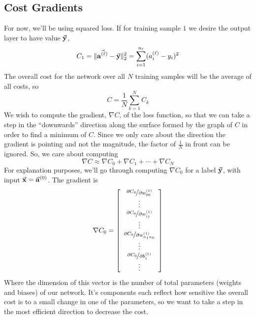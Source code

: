 \subsection{Cost Gradients}

For now, we'll be using squared loss. If for training sample $1$ we desire the output layer to have value $\vec{\mathbf{y}}$, 
\[
    C_1 = \| \vec{\mathbf{a^{(\ell)}}} - \vec{\mathbf{y}} \|_2^2 = \sum_{i = 1}^{n_\ell} (a_i^{(\ell)} - y_i)^2
\]
The overall cost for the network over all $N$ training samples will be the average of all costs, so 
\[
    C = \frac{1}{N}\sum_{k = 1}^{N} C_k
\]
We wish to compute the gradient, $\nabla C$, of the loss function, so that we can take a step in the ``downwards'' direction
along the surface formed by the graph of $C$ in order to find a minimum of $C$. Since we only care about the direction 
the gradient is pointing and not the magnitude, the factor of $\frac{1}{N}$ in front can be ignored.\ftntmk{} So, we care about 
computing 
\[
    \nabla C \approx \nabla C_0 + \nabla C_1 + \cdots + \nabla C_N
\]
For explanation purposes, we'll go through computing $\nabla C_0$ for a label $\vec{\mathbf{y}}$, with input $\vec{\mathbf{x}} = \vec{\mathbf{a}}^{(0)}$.
The gradient is 
\[
    \nabla C_0 = \left[
        \begin{array}{c}
            \nicefrac{\partial C_0}{\partial w_{00}^{(1)}} \\
            \vdots  \\
            \nicefrac{\partial C_0}{\partial w_{ij}^{(1)}} \\
            \vdots \\
            \nicefrac{\partial C_0}{\partial w_{n_1 n_0}^{(1)}} \\
            \vdots \\
            \nicefrac{\partial C_0}{\partial b_{i}^{(1)}} \\
            \vdots \\
        \end{array}
    \right]
\]
Where the dimension of this vector is the number of total parameters (weights and biases) of our network. It's components
each reflect how sensitive the overall cost is to a small change in one of the parameters, so we want to take a step 
in the most efficient direction to decrease the cost.

